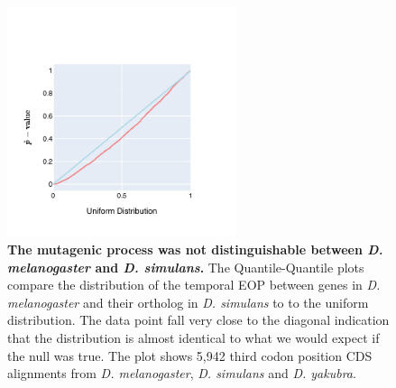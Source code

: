 \begin{figure}[ht!]
\centering
\includegraphics[width=0.6\textwidth]{figures/plots/drosophila/temp-EOP-QQ.pdf}
\caption{\textbf{The mutagenic process was not distinguishable between \textit{D. melanogaster} and \textit{D. simulans}.} The Quantile-Quantile plots compare the distribution of the temporal EOP between genes in \textit{D. melanogaster} and their ortholog in \textit{D. simulans} to  to the uniform distribution. The data point fall very close to the diagonal indication that the distribution is almost identical to what we would expect if the null was true. The plot shows 5,942 third codon position CDS alignments from \textit{D. melanogaster}, \textit{D. simulans} and \textit{D. yakubra}. }
\label{fig:drosophila:temp-EOP-qq}
\end{figure}
